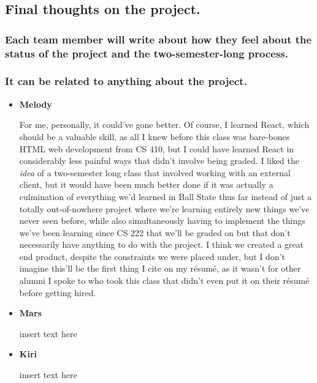 \documentclass[12pt, letterpaper]{article}
\begin{document}
\subsection{Final thoughts on the project.}
\subsubsection{Each team member will write about how they feel about the status of the project and the two-semester-long process.}
\subsubsection{It can be related to anything about the project.}
\begin{itemize}
	\item{\textbf{Melody}}
	
		For me, personally, it could've gone better. Of course, I learned React, which should be a valuable skill, 
		as all I knew before this class was bare-bones HTML web development from CS 410, but I could have learned 
		React in considerably less painful ways that didn't involve being graded. I liked the \emph{idea} of a 
		two-semester long class that involved working with an external client, but it would have been much better 
		done if it was actually a culmination of everything we'd learned in Ball State thus far instead of just 
		a totally out-of-nowhere project where we're learning entirely new things we've never seen before, while 
		also simultaneously having to implement the things we've been learning since CS 222 that we'll be graded on but that 
		don't necessarily have anything to do with the project. I think we created a great end product, despite the 
		constraints we were placed under, but I don't imagine this'll be the first thing I cite on my résumé, as it 
		wasn't for other alumni I spoke to who took this class that didn't even put it on their résumé before getting 
		hired.
	
	\item{\textbf{Mars}}
	
		insert text here
	
	\item{\textbf{Kiri}}
	
		insert text here
\end{itemize}
\end{document}
